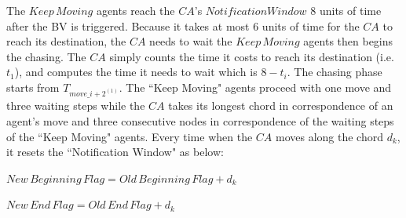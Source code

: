The $Keep\,Moving$ agents reach the $CA$'s $Notification Window$ 8 units of time after the BV is triggered. Because it takes at most 6 units of time for the $CA$ to reach its destination, the $CA$ needs to wait the $Keep\,Moving$ agents then begins the chasing. The $CA$ simply counts the time it costs to reach its destination (i.e. $t_1$), and computes the time it needs to wait which is $8-t_i$.
The chasing phase starts from $T_{move\_{{i+2}^{(1)}}}$. The ``Keep Moving" agents proceed with one move and three waiting steps while the $CA$ takes its longest chord in correspondence of an agent's move and three consecutive nodes in correspondence of the waiting steps of the ``Keep Moving" agents. Every time when the $CA$ moves along the chord $d_k$, it resets the ``Notification Window" as below: 

$New\,Beginning\,Flag=Old\,Beginning\,Flag+d_k$

$New\,End\,Flag=Old\,End\,Flag+d_k$

